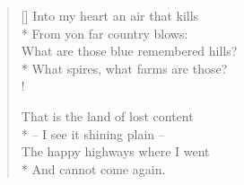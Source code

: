 \documentclass[MAIN]{subfiles}
\begin{document}
\settowidth{\versewidth}{\vin What spires, what farms are those?}
\begin{verse}[\versewidth]
Into my heart an air that kills\\*
\vin From yon far country blows:\\
What are those blue remembered hills?\\*
\vin What spires, what farms are those?\\!

That is the land of lost content\\*
\vin -- I see it shining plain --\\
The happy highways where I went\\*
\vin And cannot come again.
\end{verse}
\end{document}
